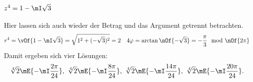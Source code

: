 	\subsection{$z^4 = 1 - \mI \sqrt{3}$}
	Hier lassen sich auch wieder der Betrag und das Argument getrennt betrachten.
	\begin{equation}
		r^4 = \vOf{1-\mI\sqrt{3}} = \sqrt{1^2 + (-\sqrt{3})^2} = 2 \quad 4\varphi = \arctan\nOf{-\sqrt{3}} = -\frac{\pi}{3} \mod\nOf{2\pi}
	\end{equation}
	Damit ergeben sich vier Lösungen:
	\begin{gather}
		\sqrt[4]{2} \mE{-\mI\frac{2\pi}{24}},\ \sqrt[4]{2} \mE{-\mI\frac{8\pi}{24}},\ \sqrt[4]{2} \mE{-\mI\frac{14\pi}{24}},\ \sqrt[4]{2} \mE{-\mI\frac{20\pi}{24}}.
	\end{gather}
